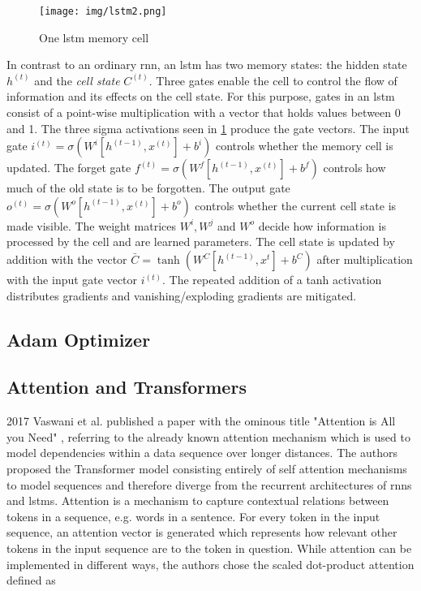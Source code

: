 \begin{figure}[h]
	\centering
	\texttt{[image: img/lstm2.png]}
	\caption{One \gls{lstm} memory cell \cite{rnn_zachary}}
	\label{fig:background:lstm}
\end{figure}
In contrast to an ordinary \gls{rnn}, an \gls{lstm} has two memory states: the hidden state $h^{(t)}$ and the \textit{cell state} $C^{(t)}$. Three gates enable the cell to control the flow of information and its effects on the cell state. For this purpose, gates in an \gls{lstm} consist of a point-wise multiplication with a vector that holds values between 0 and 1. The three sigma activations seen in \ref{fig:background:lstm} produce the gate vectors. The input gate $i^{(t)} = \sigma(W^i[h^{(t-1)},x^{(t)}] + b^i)$ controls whether the memory cell is updated. The forget gate $f^{(t)} = \sigma(W^f[h^{(t-1)},x^{(t)}] + b^f)$ controls how much of the old state is to be forgotten. The output gate $o^{(t)} = \sigma(W^o[h^{(t-1)},x^{(t)}] + b^o)$ controls whether the current cell state is made visible. The weight matrices $W^i, W^j$ and $W^o$ decide how information is processed by the cell and are learned parameters. The cell state is updated by addition with the vector $\bar{C}=\tanh(W^C[h^{(t-1)},x^{t}]+b^C)$ after multiplication with the input gate vector $i^{(t)}$. The repeated addition of a tanh activation distributes gradients and vanishing/exploding gradients are mitigated.

\subsection{Adam Optimizer}

\subsection{Attention and Transformers}

2017 Vaswani et al. published a paper with the ominous title "Attention is All you Need" \cite{attention_origin}, referring to the already known attention mechanism which is used to model dependencies within a data sequence over longer distances. The authors proposed the Transformer model consisting entirely of self attention mechanisms to model sequences and therefore diverge from the recurrent architectures of \glspl{rnn} and \glspl{lstm}. Attention is a mechanism to capture contextual relations between tokens in a sequence, e.g. words in a sentence. For every token in the input sequence, an attention vector is generated which represents how relevant other tokens in the input sequence are to the token in question. While attention can be implemented in different ways, the authors chose the scaled dot-product attention defined as 

